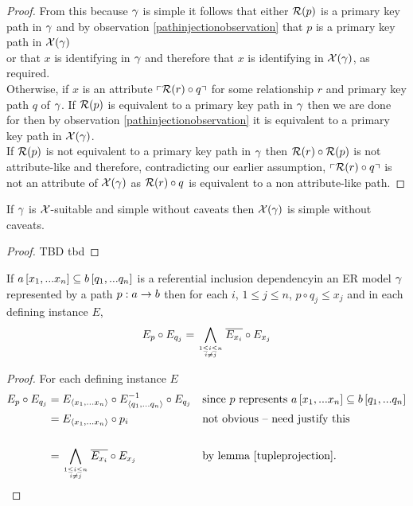 \begin{proof}
From this because $\gamma$ is simple it follows that either  $\mathcal{R}(p)$ is a primary key path in $\gamma$ and by observation \ref{pathinjectionobservation} that $p$ is a primary key path in $\mathcal{X}(\gamma)$ \\

\noindent or that $x$ is identifying in $\gamma$ and therefore that $x$ is identifying in $\mathcal{X}(\gamma)$, as required.\\

Otherwise, if $x$ is an attribute $\left\ulcorner \mathcal{R}(r) \circ q\right\urcorner$ for some relationship $r$ and primary key path $q$ of $\gamma$. If $\mathcal{R}(p)$ is equivalent to a primary key path in $\gamma$
then we are done for then by observation \ref{pathinjectionobservation} it is equivalent to a primary key path in $\mathcal{X}(\gamma)$. \\


\noindent If $\mathcal{R}(p)$ is not equivalent to a primary key path in $\gamma$ then $\mathcal{R}(r) \circ \mathcal{R}(p)$ 
is not attribute-like  and therefore, contradicting our earlier assumption,  $\left\ulcorner \mathcal{R}(r) \circ q\right\urcorner$ is not an attribute of $\mathcal{X}(\gamma)$
as $\mathcal{R}(r) \circ q$ is equivalent to a non attribute-like path.
\end{proof}

\begin{lemma}
\label{wocaveatcarrythroughlemma}
If $\gamma$ is $\mathcal{X}$-suitable and simple without caveats then $\mathcal{X}(\gamma)$ is simple without caveats.
\end{lemma}
\begin{proof}
TBD
\vspace{0.5cm}
tbd
\end{proof}


\begin{lemma}
\label{inclusiondependencyrestrictionlemma}
If $a\left[x_1,...x_n\right]\subseteq b\left[q_1,...q_n\right]$ is a referential inclusion dependencyin an ER model $\gamma$ 
represented by a path $p:a \rightarrow b$ then for each $i$, $1 \leq j \leq n$, $p \circ q_j \leq x_j$
and in each defining instance $E$,
$$E_p \circ E_{q_j} = \bigwedge\limits_{\genfrac{}{}{0pt}{}{1 \leq i \leq n}{ i \neq j}}{\overline{E_{x_i}}}\circ E_{x_j}$$
\end{lemma}
\begin{proof}
For each defining instance $E$
\begin{align*}
E_p \circ E_{q_j} &=  E_{\xntuple} \circ E ^{-1}_{\qntuple} \circ E_{q_j}  && \mbox{since $p$ represents $\incd{a}{x_1,...x_n}{b}{q_1,...q_n}$} \\
                  &= E_{\xntuple} \circ p_i                              && \mbox{not obvious -- need justify this} \\                                                                 \\
									&= \bigwedge\limits_{\genfrac{}{}{0pt}{}{1 \leq i \leq n}{ i \neq j}}{\overline{E_{x_i}}}\circ E_{x_j} && \mbox{by lemma \ref{tupleprojection}.}
\end{align*}
\end{proof}

